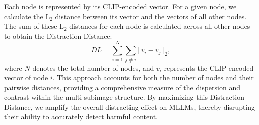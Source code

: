 Each node is represented by its CLIP-encoded vector. For a given node, we calculate the $\text{L}_2$ distance between its vector and the vectors of all other nodes. The sum of these $\text{L}_2$ distances for each node is calculated across all other nodes to obtain the Distraction Distance:
\begin{equation}
DL = \sum_{i=1}^{N} \sum_{j \neq i} ||v_i - v_j||_2,
\end{equation}
where $N$ denotes the total number of nodes, and  $v_i$  represents the CLIP-encoded vector of node $i$. This approach accounts for both the number of nodes and their pairwise distances, providing a comprehensive measure of the dispersion and contrast within the multi-subimage structure. By maximizing this Distraction Distance, we amplify the overall distracting effect on MLLMs, thereby disrupting their ability to accurately detect harmful content.




